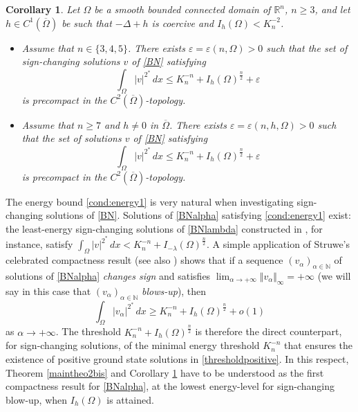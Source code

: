 \documentclass[10pt]{amsart}
\numberwithin{equation}{section}
\newcommand{\ve}{\varepsilon}
\newcommand{\Om}{\Omega}
\def \rr {\mathbb{R}}
\def \va{v_{\alpha}}
\theoremstyle{plain}
\newtheorem{corol}{Corollary}[section]
\theoremstyle{remark}
\begin{document}
\begin{corol} \label{maincorol}
Let $\Om$ be a smooth bounded connected domain of $\rr^n$, $n\geq 3$, and let $h \in C^{1}(\overline{\Om})$ be such that $-\Delta+h$ is coercive and $I_{h}(\Om)<K_{n}^{-2}$.
\begin{itemize}
\item Assume that $n \in \{3,4,5\}$. There exists $\ve = \ve(n,\Om)>0$ such that the set of \emph{sign-changing} solutions $v$ of \eqref{BN} satisfying 
$$\int_\Om |v|^{2^*}\, dx \le K_n^{-n} + I_h(\Om)^{\frac{n}{2}}  + \ve $$
is precompact in the $C^2(\overline{\Om})$-topology.
\item Assume that $n \ge 7$ and $h \neq 0$ in $\overline{\Om}$. There exists $\ve = \ve(n,h,\Om) >0$ such that the set of solutions $v$ of \eqref{BN} satisfying 
$$\int_\Om |v|^{2^*}\, dx \le K_n^{-n} + I_h(\Om)^{\frac{n}{2}} + \ve $$
is precompact in the $C^2(\overline{\Om})$-topology.
\end{itemize}
\end{corol}
The energy bound \eqref{cond:energy1} is very natural when investigating sign-changing solutions of \eqref{BN}. Solutions of \eqref{BNalpha} satisfying \eqref{cond:energy1} exist: the least-energy sign-changing solutions of \eqref{BNlambda} constructed in \cite{CeramiSoliminiStruwe, TavaresYouZou}, for instance, satisfy $\int_{\Om} |v|^{2^*} \, dx < K_{n}^{-n}+I_{-\lambda}(\Om)^{\frac{n}{2}}$.  A simple application of Struwe's \cite{Struwe} celebrated compactness result (see also \cite[Lemma 3.1]{CeramiSoliminiStruwe}) shows that if a sequence $(v_\alpha)_{\alpha \in \mathbb{N}}$ of solutions of \eqref{BNalpha} \emph{changes sign} and satisfies $\lim_{\alpha \to + \infty} \Vert v_\alpha \Vert_\infty = + \infty$ (we will say in this case that $(\va)_{\alpha \in \mathbb{N}}$ \emph{blows-up}), then 
$$ \int_{\Om}|\va|^{2^*}\, dx\geq K_{n}^{-n}+I_{h}(\Om)^{\frac{n}{2}} + o(1) $$
as $\alpha \to + \infty$. The threshold $K_{n}^{-n}+I_{h}(\Om)^{\frac{n}{2}}$ is therefore the direct counterpart, for sign-changing solutions, of the minimal energy threshold $K_n^{-n}$ that ensures the existence of positive ground state solutions in \eqref{thresholdpositive}. In this respect, Theorem \ref{maintheo2bis} and Corollary \ref{maincorol} have to be understood as the first compactness result for \eqref{BNalpha}, at the lowest energy-level for sign-changing blow-up, when $I_{h}(\Om)$ is attained. 


\medskip
\end{document}
